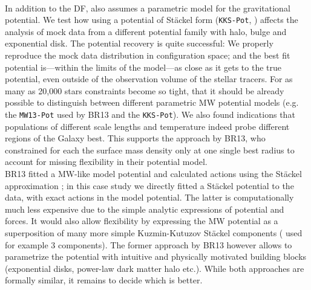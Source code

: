 \\

 In addition to the DF, \RM{} also assumes a parametric model for the gravitational potential. We test how using a potential of St\"{a}ckel form (\texttt{KKS-Pot}, \citealt{1994AA...287...43B}) affects the \RM{} analysis of mock data from a different potential family with halo, bulge and exponential disk. The potential recovery is quite successful: We properly reproduce the mock data distribution in configuration space; and the best fit potential is---within the limits of the model---as close as it gets to the true potential, even outside of the observation volume of the stellar tracers. For as many as 20,000 stars constraints become so tight, that it should be already possible to distinguish between different parametric MW potential models (e.g. the \texttt{MW13-Pot} used by BR13 and the \texttt{KKS-Pot}).  We also found indications that populations of different scale lengths and temperature indeed probe different regions of the Galaxy best.  This supports the approach by BR13, who constrained for each \MAP{} the surface mass density only at one single best radius to account for missing flexibility in their potential model.
\\BR13 fitted a MW-like model potential and calculated actions using the St\"{a}ckel approximation \citep{2012MNRAS.426.1324B}; in this case study we directly fitted a St\"{a}ckel potential to the data, with exact actions in the model potential. The latter is computationally much less expensive due to the simple analytic expressions of potential and forces. It would also allow flexibility by expressing the MW potential as a superposition of many more simple Kuzmin-Kutuzov St\"{a}ckel components (\citet{2003MNRAS.340..752F} used for example 3 components). The former approach by BR13 however allows to parametrize the potential with intuitive and physically motivated building blocks (exponential disks, power-law dark matter halo etc.). While both approaches are formally similar, it remains to decide which is better.\\

